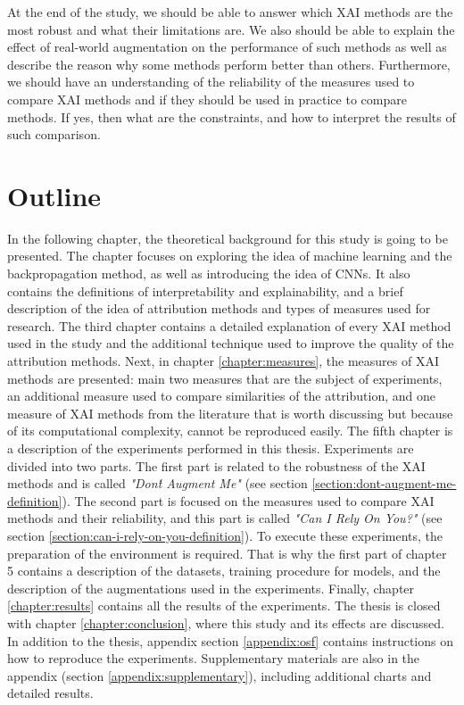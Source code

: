 \vspace{\baselineskip}

At the end of the study, we should be able to answer which XAI methods are the most robust and what their limitations are. We also should be able to explain the effect of real-world augmentation on the performance of such methods as well as describe the reason why some methods perform better than others. Furthermore, we should have an understanding of the reliability of the measures used to compare XAI methods and if they should be used in practice to compare methods. If yes, then what are the constraints, and how to interpret the results of such comparison.

\section{Outline}

In the following chapter, the theoretical background for this study is going to be presented. The chapter focuses on exploring the idea of machine learning and the backpropagation method, as well as introducing the idea of CNNs. It also contains the definitions of interpretability and explainability, and a brief description of the idea of attribution methods and types of measures used for research. The third chapter contains a detailed explanation of every XAI method used in the study and the additional technique used to improve the quality of the attribution methods. Next, in chapter \ref{chapter:measures}, the measures of XAI methods are presented: main two measures that are the subject of experiments, an additional measure used to compare similarities of the attribution, and one measure of XAI methods from the literature that is worth discussing but because of its computational complexity, cannot be reproduced easily. The fifth chapter is a description of the experiments performed in this thesis. Experiments are divided into two parts. The first part is related to the robustness of the XAI methods and is called \textit{"Don\'t Augment Me"} (see section \ref{section:dont-augment-me-definition}). The second part is focused on the measures used to compare XAI methods and their reliability, and this part is called \textit{"Can I Rely On You?"} (see section \ref{section:can-i-rely-on-you-definition}). To execute these experiments, the preparation of the environment is required. That is why the first part of chapter 5 contains a description of the datasets, training procedure for models, and the description of the augmentations used in the experiments. Finally, chapter \ref{chapter:results} contains all the results of the experiments. The thesis is closed with chapter \ref{chapter:conclusion}, where this study and its effects are discussed. In addition to the thesis, appendix section \ref{appendix:osf} contains instructions on how to reproduce the experiments. Supplementary materials are also in the appendix (section \ref{appendix:supplementary}), including additional charts and detailed results.